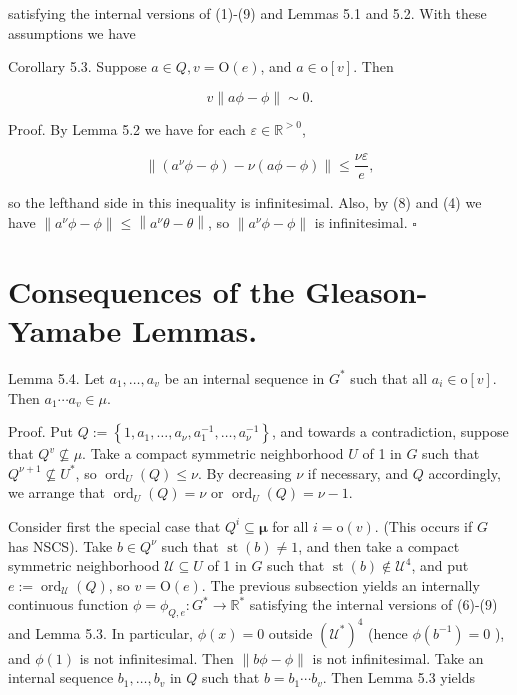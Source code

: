 \documentclass[10pt]{article}
\begin{document}
satisfying the internal versions of (1)-(9) and Lemmas 5.1 and 5.2. With these assumptions we have

Corollary 5.3. Suppose $a \in Q, v=\mathrm{O}(e)$, and $a \in \mathrm{o}[v]$. Then

$$
v\|a \phi-\phi\| \sim 0 .
$$

Proof. By Lemma 5.2 we have for each $\varepsilon \in \mathbb{R}^{>0}$,

$$
\left\|\left(a^{\nu} \phi-\phi\right)-\nu(a \phi-\phi)\right\| \leq \frac{\nu \varepsilon}{e},
$$

so the lefthand side in this inequality is infinitesimal. Also, by (8) and (4) we have $\left\|a^{\nu} \phi-\phi\right\| \leq\left\|a^{\nu} \theta-\theta\right\|$, so $\left\|a^{\nu} \phi-\phi\right\|$ is infinitesimal. \(\square\)

\section*{Consequences of the Gleason-Yamabe Lemmas.}
Lemma 5.4. Let $a_{1}, \ldots, a_{v}$ be an internal sequence in $G^{*}$ such that all $a_{i} \in \mathrm{o}[v]$. Then $a_{1} \cdots a_{v} \in \mu$.

Proof. Put $Q:=\left\{1, a_{1}, \ldots, a_{\nu}, a_{1}^{-1}, \ldots, a_{\nu}^{-1}\right\}$, and towards a contradiction, suppose that $Q^{v} \nsubseteq \mu$. Take a compact symmetric neighborhood $U$ of 1 in $G$ such that $Q^{\nu+1} \nsubseteq U^{*}$, so $\operatorname{ord}_{U}(Q) \leq \nu$. By decreasing $\nu$ if necessary, and $Q$ accordingly, we arrange that $\operatorname{ord}_{U}(Q)=\nu$ or $\operatorname{ord}_{U}(Q)=\nu-1$.

Consider first the special case that $Q^{i} \subseteq \boldsymbol{\mu}$ for all $i=\mathrm{o}(v)$. (This occurs if $G$ has NSCS). Take $b \in Q^{\nu}$ such that $\operatorname{st}(b) \neq 1$, and then take a compact symmetric neighborhood $\mathcal{U} \subseteq U$ of 1 in $G$ such that $\operatorname{st}(b) \notin \mathcal{U}^{4}$, and put $e:=\operatorname{ord}_{\mathcal{U}}(Q)$, so $v=\mathrm{O}(e)$. The previous subsection yields an internally continuous function $\phi=\phi_{Q, e}: G^{*} \rightarrow \mathbb{R}^{*}$ satisfying the internal versions of (6)-(9) and Lemma 5.3. In particular, $\phi(x)=0$ outside $\left(\mathcal{U}^{*}\right)^{4}$ (hence $\phi\left(b^{-1}\right)=0$ ), and $\phi(1)$ is not infinitesimal. Then $\|b \phi-\phi\|$ is not infinitesimal. Take an internal sequence $b_{1}, \ldots, b_{v}$ in $Q$ such that $b=b_{1} \cdots b_{v}$. Then Lemma 5.3 yields
\end{document}
